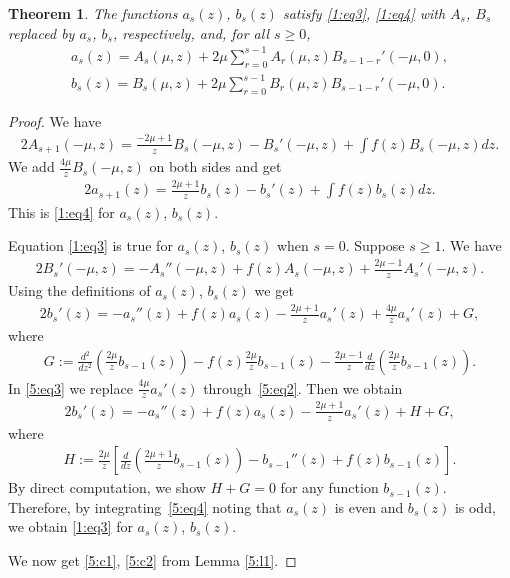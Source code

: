 \documentclass[pdftex]{sigma}
\numberwithin{equation}{section}
\newtheorem{Theorem}{Theorem}[section]
\begin{document}
\begin{Theorem}\label{5:t1}
The functions $a_s(z)$, $b_s(z)$ satisfy \eqref{1:eq3}, \eqref{1:eq4} with $A_s$, $B_s$ replaced by $a_s$, $b_s$, respectively, and, for all $s\ge 0$,
\begin{gather}
a_s(z) = A_s(\mu,z)+2\mu\sum_{r=0}^{s-1} A_r(\mu,z)B_{s-1-r}'(-\mu,0),\label{5:c1}\\
b_s(z) = B_s(\mu,z)+2\mu\sum_{r=0}^{s-1} B_r(\mu,z)B_{s-1-r}'(-\mu,0).\label{5:c2}
\end{gather}
\end{Theorem}
\begin{proof}
We have
\begin{gather*} 2 A_{s+1}(-\mu,z)=\frac{-2\mu+1}{z} B_s(-\mu,z)- B_s'(-\mu,z)+\int f(z) B_s(-\mu,z) dz .\end{gather*}
We add $\frac{4\mu}{z} B_s(-\mu,z)$ on both sides and get
\begin{gather}\label{5:eq2}
2a_{s+1}(z)=\frac{2\mu+1}{z}b_s(z)-b_s'(z)+\int f(z)b_s(z) dz .
\end{gather}
This is \eqref{1:eq4} for $a_s(z)$, $b_s(z)$.

Equation \eqref{1:eq3} is true for $a_s(z)$, $b_s(z)$ when $s=0$. Suppose $s\ge 1$.
We have
\begin{gather*} 2 B_s'(-\mu,z)=- A_s''(-\mu,z)+f(z) A_s(-\mu,z)+\frac{2\mu-1}{z} A_s'(-\mu,z) .\end{gather*}
Using the def\/initions of $a_s(z)$, $b_s(z)$ we get
\begin{gather}\label{5:eq3}
 2b_s'(z)=-a_s''(z)+f(z)a_s(z)-\frac{2\mu+1}{z}a_s'(z)+\frac{4\mu}{z}a_s'(z)+G,
\end{gather}
where
\begin{gather*} G:=\frac{d^2}{dz^2}\left(\frac{2\mu}{z} b_{s-1}(z)\right)-f(z)\frac{2\mu}{z}b_{s-1}(z)
-\frac{2\mu-1}{z}\frac{d}{dz}\left(\frac{2\mu}{z} b_{s-1}(z)\right) .
\end{gather*}
In \eqref{5:eq3} we replace $\frac{4\mu}{z}a_s'(z)$ through~\eqref{5:eq2}. Then we obtain
\begin{gather}\label{5:eq4}
2b_s'(z)=-a_s''(z)+f(z)a_s(z)-\frac{2\mu+1}{z}a_s'(z)+H+G,
\end{gather}
where
\begin{gather*}
H:=\frac{2\mu}{z}\left[\frac{d}{dz}\left(\frac{2\mu+1}{z}b_{s-1}(z)\right)-b_{s-1}''(z)+f(z)b_{s-1}(z)\right] .
\end{gather*}
By direct computation, we show $H+G=0$ for any function $b_{s-1}(z)$. Therefore, by integra\-ting~\eqref{5:eq4}
noting that $a_s(z)$ is even and $b_s(z)$ is odd, we obtain \eqref{1:eq3} for $a_s(z)$, $b_s(z)$.

We now get \eqref{5:c1}, \eqref{5:c2} from Lemma \ref{5:l1}.
\end{proof}
\end{document}
